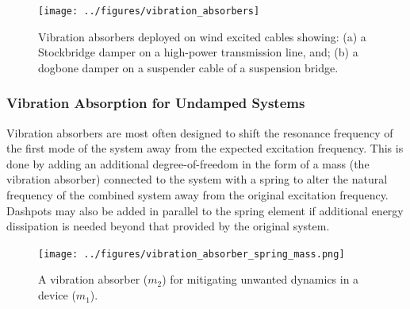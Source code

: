 \documentclass[12pt,letter]{article}
\begin{document}
\begin{figure}[H]
    \centering
    \texttt{[image: ../figures/vibration\_absorbers]}
    \caption{Vibration absorbers deployed on wind excited cables showing: (a) a Stockbridge damper on a high-power transmission line\protect\footnotemark[1], and; (b) a dogbone damper on a suspender cable of a suspension bridge\protect\footnotemark[2].}
    \label{fig:vibration_absorbers}
\end{figure}


\subsubsection{Vibration Absorption for Undamped Systems}
\label{sec:Vibration_Absorption_for_Undamped_Systems}

Vibration absorbers are most often designed to shift the resonance frequency of the first mode of the system away from the expected excitation frequency. This is done by adding an additional degree-of-freedom in the form of a mass (the vibration absorber) connected to the system with a spring to alter the natural frequency of the combined system away from the original excitation frequency. Dashpots may also be added in parallel to the spring element if additional energy dissipation is needed beyond that provided by the original system. 

\begin{figure}[H]
    \centering
    \texttt{[image: ../figures/vibration\_absorber\_spring\_mass.png]}
    \caption{A vibration absorber ($m_2$) for mitigating unwanted dynamics in a device ($m_1$).}
    \label{fig:vibration_absorber_spring_mass}
\end{figure}
\end{document}
